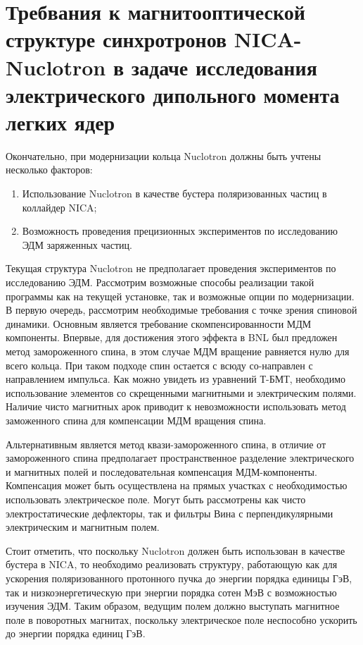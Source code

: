 	\section{Требвания к магнитооптической структуре синхротронов NICA-Nuclotron в задаче исследования электрического дипольного момента легких ядер}\label{sec:EDM/requirements}

Окончательно, при модернизации кольца Nuclotron должны быть учтены несколько факторов:

\begin{enumerate}
    \item Использование Nuclotron в качестве бустера поляризованных частиц в коллайдер NICA;
    \item Возможность проведения прецизионных экспериментов по исследованию ЭДМ заряженных частиц.
\end{enumerate}

\noindent Текущая структура Nuclotron не предполагает проведения экспериментов по исследованию ЭДМ. Рассмотрим возможные способы реализации такой программы как на текущей установке, так и возможные опции по модернизации. В первую очередь, рассмотрим необходимые требования с точке зрения спиновой динамики. Основным является требование скомпенсированности МДМ компоненты. Впервые, для достижения этого эффекта в BNL был предложен метод замороженного спина, в этом случае МДМ вращение равняется нулю для всего кольца. При таком подходе спин остается с всюду со-направлен с направлением импульса. Как можно увидеть из уравнений Т-БМТ, необходимо использование элементов со скрещенными магнитными и электрическим полями. 
Наличие чисто магнитных арок приводит к невозможности использовать метод заможенного спина для компенсации МДМ вращения спина. 
\par Альтернативным является метод квази-замороженного спина, в отличие от замороженного спина предполагает пространственное разделение электрического и магнитных полей и последовательная компенсация МДМ-компоненты. Компенсация может быть осуществлена на прямых участках с необходимостью использовать электрическое поле. Могут быть рассмотрены как чисто электростатические дефлекторы, так и фильтры Вина с перпендикулярными электрическим и магнитным полем.

\noindent Стоит отметить, что поскольку Nuclotron должен быть использован в качестве бустера в NICA, то необходимо реализовать структуру, работающую как для ускорения поляризованного протонного пучка до энергии порядка единицы ГэВ, так и низкоэнергетическую при энергии порядка сотен МэВ с возможностью изучения ЭДМ. Таким образом, ведущим полем должно выступать магнитное поле в поворотных магнитах, поскольку электрическое поле неспособно ускорить до энергии порядка единиц ГэВ. 

